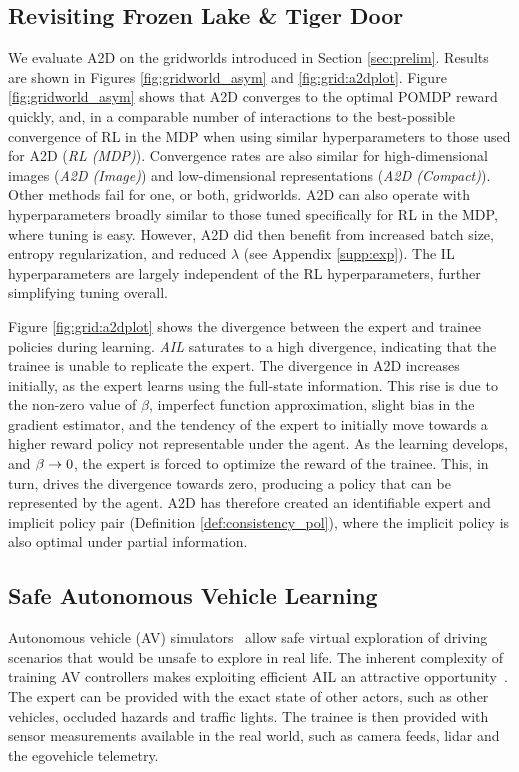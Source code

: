 \label{sec:results}

\subsection{Revisiting Frozen Lake \& Tiger Door}
\label{sec:results:gridworld} 
We evaluate A2D on the gridworlds introduced in Section \ref{sec:prelim}.  Results are shown in Figures \ref{fig:gridworld_asym} and \ref{fig:grid:a2dplot}.  Figure \ref{fig:gridworld_asym} shows that A2D converges to the optimal POMDP reward quickly, and, in a comparable number of interactions to the best-possible convergence of RL in the MDP when using similar hyperparameters to those used for A2D (\emph{RL (MDP)}).  Convergence rates are also similar for high-dimensional images (\emph{A2D (Image)}) and low-dimensional representations (\emph{A2D (Compact)}).  Other methods fail for one, or both, gridworlds.  A2D can also operate with hyperparameters broadly similar to those tuned specifically for RL in the MDP, where tuning is easy.  However, A2D did then benefit from increased batch size, entropy regularization, and reduced $\lambda$ (see Appendix \ref{supp:exp}).  The IL hyperparameters are largely independent of the RL hyperparameters, further simplifying tuning overall.  



Figure \ref{fig:grid:a2dplot} shows the divergence between the expert and trainee policies during learning.  \emph{AIL} saturates to a high divergence, indicating that the trainee is unable to replicate the expert.  The divergence in A2D increases initially, as the expert learns using the full-state information.  This rise is due to the non-zero value of $\beta$, imperfect function approximation, slight bias in the gradient estimator, and the tendency of the expert to initially move towards a higher reward policy not representable under the agent.  As the learning develops, and $\beta \rightarrow 0$, the expert is forced to optimize the reward of the trainee.  This, in turn, drives the divergence towards zero, producing a policy that can be represented by the agent.  A2D has therefore created an identifiable expert and implicit policy pair (Definition \ref{def:consistency_pol}), where the implicit policy is also optimal under partial information.  


\subsection{Safe Autonomous Vehicle Learning}
\label{sec:results:carla}
Autonomous vehicle (AV) simulators~\citep{Dosovitskiy17, wymann_torcs_2014, kato_open_2015} allow safe virtual exploration of driving scenarios that would be unsafe to explore in real life.  The inherent complexity of training AV controllers makes exploiting efficient AIL an attractive opportunity~\citep{Chen2019}.  The expert can be provided with the exact state of other actors, such as other vehicles, occluded hazards and traffic lights.  The trainee is then provided with sensor measurements available in the real world, such as camera feeds, lidar and the egovehicle telemetry.  

